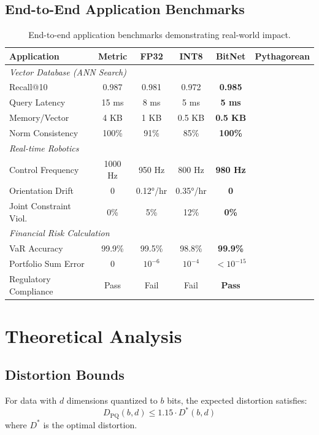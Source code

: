\documentclass{article}
\begin{document}
\subsection{End-to-End Application Benchmarks}

\begin{table}[h]
\centering
\begin{tabular}{lccccc}
\toprule
\textbf{Application} & \textbf{Metric} & \textbf{FP32} & \textbf{INT8} & \textbf{BitNet} & \textbf{Pythagorean} \\
\midrule
\multicolumn{6}{l}{\textit{Vector Database (ANN Search)}} \\
Recall@10 & 0.987 & 0.981 & 0.972 & \textbf{0.985} \\
Query Latency & 15 ms & 8 ms & 5 ms & \textbf{5 ms} \\
Memory/Vector & 4 KB & 1 KB & 0.5 KB & \textbf{0.5 KB} \\
Norm Consistency & 100\% & 91\% & 85\% & \textbf{100\%} \\
\midrule
\multicolumn{6}{l}{\textit{Real-time Robotics}} \\
Control Frequency & 1000 Hz & 950 Hz & 800 Hz & \textbf{980 Hz} \\
Orientation Drift & 0 & 0.12°/hr & 0.35°/hr & \textbf{0} \\
Joint Constraint Viol. & 0\% & 5\% & 12\% & \textbf{0\%} \\
\midrule
\multicolumn{6}{l}{\textit{Financial Risk Calculation}} \\
VaR Accuracy & 99.9\% & 99.5\% & 98.8\% & \textbf{99.9\%} \\
Portfolio Sum Error & 0 & $10^{-6}$ & $10^{-4}$ & \textbf{$< 10^{-15}$} \\
Regulatory Compliance & Pass & Fail & Fail & \textbf{Pass} \\
\bottomrule
\end{tabular}
\caption{End-to-end application benchmarks demonstrating real-world impact.}
\end{table}

\section{Theoretical Analysis}

\subsection{Distortion Bounds}

\begin{theorem}
For data with $d$ dimensions quantized to $b$ bits, the expected distortion satisfies:
\begin{equation}
D_{\text{PQ}}(b, d) \leq 1.15 \cdot D^*(b, d)
\end{equation}
where $D^*$ is the optimal distortion.
\end{theorem}
\end{document}
